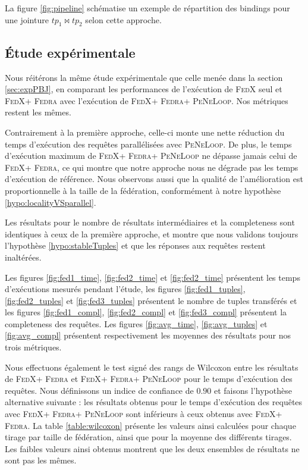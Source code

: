 \documentclass[a4paper]{article}
\def\fedra{\textsc{Fedra}\xspace}
\def\fedx{\textsc{FedX}\xspace}
\def\peneloop{\textsc{PeNeLoop}\xspace}
\begin{document}
La figure \ref{fig:pipeline} schématise un exemple de répartition des bindings pour une jointure $tp_1 \bowtie tp_2$ selon cette approche.





\subsection{Étude expérimentale}

Nous réitérons la même étude expérimentale que celle menée dans la section \ref{sec:expPBJ}, en comparant les performances de l'exécution de \fedx seul et \fedx + \fedra avec l'exécution de \fedx + \fedra + \peneloop. Nos métriques restent les mêmes.

Contrairement à la première approche, celle-ci monte une nette réduction du temps d'exécution des requêtes parallélisées avec \peneloop. De plus, le temps d'exécution maximum de \fedx + \fedra + \peneloop ne dépasse jamais celui de \fedx + \fedra, ce qui montre que notre approche nous ne dégrade pas les temps d'exécution de référence. Nous observons aussi que la qualité de l'amélioration est proportionnelle à la taille de la fédération, conformément à notre hypothèse \ref{hypo:localityVSparallel}.

Les résultats pour le nombre de résultats intermédiaires et la completeness sont identiques à ceux de la première approche, et montre que nous validons toujours l'hypothèse \ref{hypo:stableTuples} et que les réponses aux requêtes restent inaltérées.

Les figures \ref{fig:fed1_time}, \ref{fig:fed2_time} et \ref{fig:fed2_time} présentent les temps d'exécutions mesurés pendant l'étude, les figures \ref{fig:fed1_tuples}, \ref{fig:fed2_tuples} et \ref{fig:fed3_tuples} présentent le nombre de tuples transférés et les figures \ref{fig:fed1_compl}, \ref{fig:fed2_compl} et \ref{fig:fed3_compl} présentent la completeness des requêtes. Les figures \ref{fig:avg_time}, \ref{fig:avg_tuples} et \ref{fig:avg_compl} présentent respectivement les moyennes des résultats pour nos trois métriques.

Nous effectuons également le test signé des rangs de Wilcoxon \cite{wilcoxon1992individual} entre les résultats de \fedx + \fedra et \fedx + \fedra + \peneloop pour le temps d'exécution des requêtes. Nous définissons un indice de confiance de $0.90$ et faisons l'hypothèse alternative suivante : les résultats obtenus pour le temps d'exécution des requêtes avec \fedx + \fedra + \peneloop sont inférieurs à ceux obtenus avec \fedx + \fedra. La table \ref{table:wilcoxon} présente les valeurs ainsi calculées pour chaque tirage par taille de fédération, ainsi que pour la moyenne des différents tirages. Les faibles valeurs ainsi obtenus montrent que les deux ensembles de résultats ne sont pas les mêmes.
\end{document}
